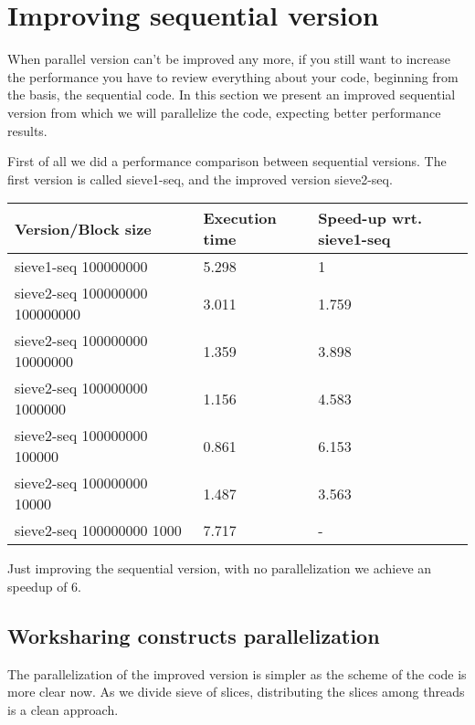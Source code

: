 \section{Improving sequential version}
When parallel version can't be improved any more, if you still want to increase the performance you have to review everything about your code, beginning from the basis, the sequential code. In this section we present an improved sequential version from which we will parallelize the code, expecting better performance results.

First of all we did a performance comparison between sequential versions. The first version is called sieve1-seq, and the improved version sieve2-seq.

\begin{table}[h!]
\begin{tabular}{|l|l|l|}
\hline
Version/Block size             & Execution time & Speed-up wrt. sieve1-seq \\ \hline
sieve1-seq 100000000           & 5.298          & 1                        \\ \hline
sieve2-seq 100000000 100000000 & 3.011          & 1.759                    \\ \hline
sieve2-seq 100000000 10000000  & 1.359          & 3.898                    \\ \hline
sieve2-seq 100000000 1000000   & 1.156          & 4.583                    \\ \hline
sieve2-seq 100000000 100000    & 0.861          & 6.153                    \\ \hline
sieve2-seq 100000000 10000     & 1.487          & 3.563                    \\ \hline
sieve2-seq 100000000 1000      & 7.717          & -                        \\ \hline
\end{tabular}
\end{table}

Just improving the sequential version, with no parallelization we achieve an speedup of 6.

\subsection{Worksharing constructs parallelization}
The parallelization of the improved version is simpler as the scheme of the code is more clear now. As we divide sieve of slices, distributing the slices among threads is a clean approach. 

